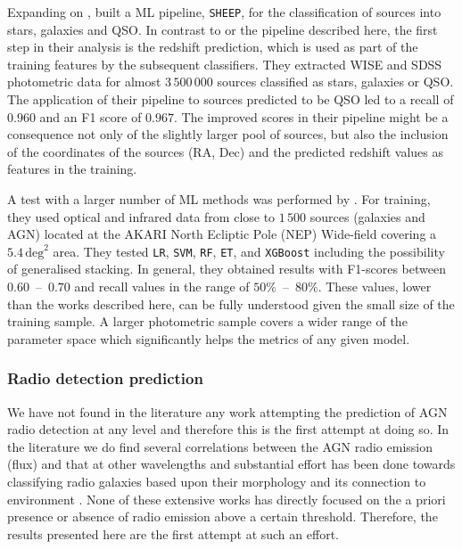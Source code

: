 \documentclass{aa}
\begin{document}
Expanding on \citet{2020A&A...639A..84C}, \citet{2022A&A...666A..87C} built a ML pipeline, \texttt{SHEEP}, for the classification of sources into stars, galaxies and QSO. In contrast to \citet{2020A&A...639A..84C} or the pipeline described here, the first step in their analysis is the redshift prediction, which is used as part of the training features by the subsequent classifiers. They extracted WISE and SDSS \citep[DR15;][]{2019ApJS..240...23A} photometric data for almost $3\,500\,000$ sources classified as stars, galaxies or QSO. The application of their pipeline to sources predicted to be QSO led to a recall of $0.960$ and an F1 score of $0.967$. The improved scores in their pipeline might be a consequence not only of the slightly larger pool of sources, but also the inclusion of the coordinates of the sources (RA, Dec) and the predicted redshift values as features in the training. %

A test with a larger number of ML methods was performed by \citet{2021A&A...651A.108P}. For training, they used optical and infrared data from close to $1\,500$ sources (galaxies and AGN) located at the AKARI North Ecliptic Pole (NEP) Wide-field \citep{2009PASJ...61..375L, 2012A&A...548A..29K} covering a $5.4\, \mathrm{deg}^{2}$ area. They tested  \verb|LR|, \verb|SVM|, \verb|RF|, \verb|ET|, and \verb|XGBoost| including the possibility of generalised stacking. In general, they obtained results with F1-scores between $0.60$~--~$0.70$ and recall values in the range of $50\%$~--~$80\%$. 
These values, lower than the works described here, can be fully understood given the small size of the training sample. A larger photometric sample covers a wider range of the parameter space which significantly helps the metrics of any given model.

\subsubsection{Radio detection prediction}\label{sec:previous_radio_detection}

We have not found in the literature any work attempting the prediction of AGN radio detection at any level and therefore this is the first attempt at doing so. In the literature we do find several correlations between the AGN radio emission (flux) and that at other wavelengths \citep[e.g. with infrared emission,][]{1985ApJ...298L...7H, 1992ARA&A..30..575C} and substantial effort has been done towards classifying radio galaxies based upon their morphology \citep[e.g.][FRI, FRII, bent jets, etc.]{2017ApJS..230...20A, 2019MNRAS.482.1211W} and its connection to environment \citep{2008A&ARv..15...67M, 2022A&ARv..30....6M}. None of these extensive works has directly focused on the a priori presence or absence of radio emission above a certain threshold. Therefore, the results presented here are the first attempt at such an effort.
\end{document}

